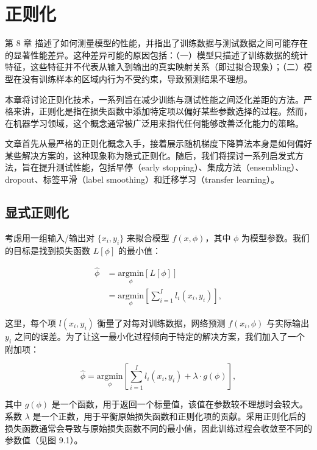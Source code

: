 \chapter{正则化}


第 8 章 描述了如何测量模型的性能，并指出了训练数据与测试数据之间可能存在的显著性能差异。这种差异可能的原因包括：（一）模型只描述了训练数据的统计特征，这些特征并不代表从输入到输出的真实映射关系（即过拟合现象）；（二）模型在没有训练样本的区域内行为不受约束，导致预测结果不理想。

本章将讨论正则化技术，一系列旨在减少训练与测试性能之间泛化差距的方法。严格来讲，正则化是指在损失函数中添加特定项以偏好某些参数选择的过程。然而，在机器学习领域，这个概念通常被广泛用来指代任何能够改善泛化能力的策略。

文章首先从最严格的正则化概念入手，接着展示随机梯度下降算法本身是如何偏好某些解决方案的，这种现象称为隐式正则化。随后，我们将探讨一系列启发式方法，旨在提升测试性能，包括早停（early stopping）、集成方法（ensembling）、dropout、标签平滑（label smoothing）和迁移学习（transfer learning）。

\section{显式正则化}

考虑用一组输入/输出对 \(\{x_i, y_i\}\) 来拟合模型 \(f(x, \phi)\)，其中 \(\phi\) 为模型参数。我们的目标是找到损失函数 \(L[\phi]\) 的最小值：


\begin{align}
	\hat{\phi} &= \underset{\phi}{\text{argmin}} [L[\phi]] \\
	&= \underset{\phi}{\text{argmin}} \left[ \sum_{i=1}^I l_i(x_i, y_i) \right], 
\end{align} 


这里，每个项 \(l(x_i, y_i)\) 衡量了对每对训练数据，网络预测 \(f(x_i, \phi)\) 与实际输出 \(y_i\) 之间的误差。为了让这一最小化过程倾向于特定的解决方案，我们加入了一个附加项：

\begin{equation}
\hat{\phi} = \underset{\phi}{\text{argmin}} \left[ \sum_{i=1}^I l_i(x_i, y_i) + \lambda \cdot g(\phi) \right], 
\end{equation}

其中 \(g(\phi)\) 是一个函数，用于返回一个标量值，该值在参数较不理想时会较大。系数 \(\lambda\) 是一个正数，用于平衡原始损失函数和正则化项的贡献。采用正则化后的损失函数通常会导致与原始损失函数不同的最小值，因此训练过程会收敛至不同的参数值（见图 9.1）。

